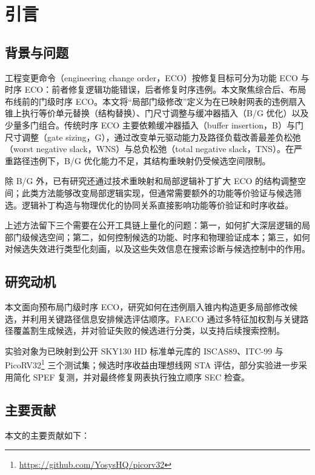 \documentclass[twocolumn,10pt,fontset=windows]{ctexart}
\begin{document}
\section{引言}

\subsection{背景与问题}
工程变更命令（engineering change order，ECO）按修复目标可分为功能 ECO 与时序 ECO：前者修复逻辑功能错误，后者修复时序违例。本文聚焦综合后、布局布线前的门级时序 ECO。本文将“局部门级修改”定义为在已映射网表的违例扇入锥上执行等价单元替换（结构替换）、门尺寸调整与缓冲器插入（B/G 优化）以及少量多门组合。传统时序 ECO 主要依赖缓冲器插入（buffer insertion，B）与门尺寸调整（gate sizing，G），通过改变单元驱动能力及路径负载改善最差负松弛（worst negative slack，WNS）与总负松弛（total negative slack，TNS）。在严重路径违例下，B/G 优化能力不足，其结构重映射仍受候选空间限制\cite{ho2010eco,liu2021rlsizer,chen2024aito}。

除 B/G 外，已有研究还通过技术重映射和局部逻辑补丁扩大 ECO 的结构调整空间；此类方法能够改变局部逻辑实现，但通常需要额外的功能等价验证与候选筛选。逻辑补丁构造与物理优化的协同关系直接影响功能等价验证和时序收益。

上述方法留下三个需要在公开工具链上量化的问题：第一，如何扩大深层逻辑的局部门级候选空间；第二，如何控制候选的功能、时序和物理验证成本；第三，如何对候选失效进行类型化刻画，以及这些失效信息在搜索诊断与候选控制中的作用。
\subsection{研究动机}
本文面向预布局门级时序 ECO，研究如何在违例扇入锥内构造更多局部修改候选，并利用关键路径信息安排候选评估顺序。FAECO 通过多特征加权割与关键路径覆盖割生成候选，并对验证失败的候选进行分类，以支持后续搜索控制。

实验对象为已映射到公开 SKY130 HD 标准单元库的 ISCAS89\cite{iscas89}、ITC-99\cite{itc99} 与 PicoRV32\footnote{\url{https://github.com/YosysHQ/picorv32}} 三个测试集；候选时序收益由理想线网 STA 评估，部分实验进一步采用简化 SPEF 复测，并对最终修复网表执行独立顺序 SEC 检查。

\subsection{主要贡献}
本文的主要贡献如下：
\end{document}
